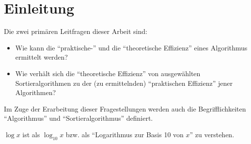 \chapter*{Einleitung}


Die zwei primären Leitfragen dieser Arbeit sind:

\begin{itemize}
    \item Wie kann die \enquote{praktische-} und die \enquote{theoretische Effizienz} eines Algorithmus ermittelt werden?
    \item Wie verhält sich die \enquote{theoretische Effizienz} von ausgewählten Sortieralgorithmen zu der (zu ermittelnden) \enquote{praktischen Effizienz} jener Algorithmen?
\end{itemize}

Im Zuge der Erarbeitung dieser Fragestellungen werden auch die Begrifflichkeiten \enquote{Algorithmus} und \enquote{Sortieralgorithmus} definiert.

$\log x$ ist als $\log_{10} x$ bzw. als \enquote{Logarithmus zur Basis 10 von $x$} zu verstehen. 
